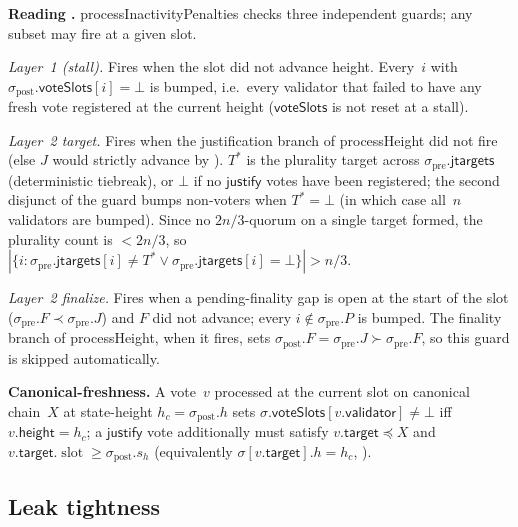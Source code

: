 \documentclass{article}
\newcommand{\slot}[0]{\ensuremath{\operatorname{\mathrm{slot}}}}
\newcommand{\target}{\mathsf{target}}
\newcommand{\height}{\mathsf{height}}
\newcommand{\validator}{\mathsf{validator}}
\newcommand{\just}{\ensuremath{\mathsf{justify}}\xspace}
\newcommand{\jtargets}{\mathsf{jtargets}}
\newcommand{\voteSlots}{\mathsf{voteSlots}}
\newcommand{\processHeight}{\textsf{processHeight}\xspace}
\newcommand{\processInactivityPenalties}{\textsf{processInactivityPenalties}\xspace}
\renewcommand{\paragraph}[1]{\vspace{7pt}\noindent\textbf{#1}}
\theoremstyle{plain}
\theoremstyle{definition}
\theoremstyle{remark}
\begin{document}
\paragraph{Reading .}
\processInactivityPenalties checks three independent guards; any subset may fire at a given slot.

\emph{Layer~1 (stall).} Fires when the slot did not advance height.
Every~$i$ with $\sigma_{\mathrm{post}}.\voteSlots[i] = \bot$ is bumped, i.e.\ every validator that failed to have any fresh vote registered at the current height ($\voteSlots$ is not reset at a stall).

\emph{Layer~2 target.} Fires when the justification branch of \processHeight did not fire (else $J$ would strictly advance by ).
$T^*$ is the plurality target across $\sigma_{\mathrm{pre}}.\jtargets$ (deterministic tiebreak), or $\bot$ if no \just votes have been registered; the second disjunct of the guard bumps non-voters when $T^* = \bot$ (in which case all~$n$ validators are bumped).
Since no $2n/3$-quorum on a single target formed, the plurality count is $< 2n/3$, so $|\{i : \sigma_{\mathrm{pre}}.\jtargets[i] \neq T^* \vee \sigma_{\mathrm{pre}}.\jtargets[i] = \bot\}| > n/3$.

\emph{Layer~2 finalize.} Fires when a pending-finality gap is open at the start of the slot ($\sigma_{\mathrm{pre}}.F \prec \sigma_{\mathrm{pre}}.J$) and $F$ did not advance; every $i \notin \sigma_{\mathrm{pre}}.P$ is bumped.
The finality branch of \processHeight, when it fires, sets $\sigma_{\mathrm{post}}.F = \sigma_{\mathrm{pre}}.J \succ \sigma_{\mathrm{pre}}.F$, so this guard is skipped automatically.

\paragraph{Canonical-freshness.}
A vote~$v$ processed at the current slot on canonical chain~$X$ at state-height $h_c = \sigma_{\mathrm{post}}.h$ sets $\sigma.\voteSlots[v.\validator] \neq \bot$ iff $v.\height = h_c$; a \just vote additionally must satisfy $v.\target \preceq X$ and $v.\target.\slot \geq \sigma_{\mathrm{post}}.s_h$ (equivalently $\sigma[v.\target].h = h_c$, ).

\subsection{Leak tightness}
\end{document}
